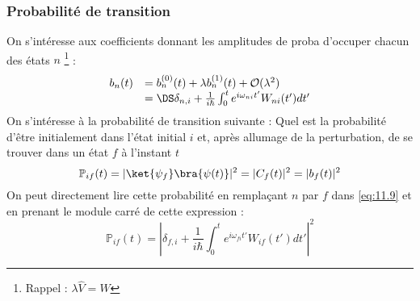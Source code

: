		\subsubsection{Probabilité de transition}
		On s'intéresse aux coefficients donnant les amplitudes de proba d'occuper chacun des états $n$
		\footnote{Rappel : $\lambda \hat{V} =\hat{W}$} :
		\begin{equation}
		\begin{array}{ll}
		b_n(t) &= b_n^{(0)}(t) + \lambda b_n^{(1)}(t) + \mathcal{O}(\lambda^2)		\\
		&=\DS \delta_{n,i} + \frac{1}{i\hbar}\int_0^t e^{i\omega_{ni}t'}W_{ni}(t')dt'
		\end{array}
		\label{eq:11.9}
		\end{equation}
		On s'intéresse à la probabilité de transition suivante : Quel est la probabilité d'être 
		initialement dans l'état initial $i$ et, après allumage de la perturbation, de se 
		trouver dans un état $f$ à l'instant $t$ 
		\begin{equation}
		\mathbb{P}_{if}(t) = |\ket{\psi_f}\bra{\psi(t)}|^2 = |C_f(t)|^2 = |b_f(t)|^2
		\end{equation}
		On peut directement lire cette probabilité en remplaçant $n$ par $f$ dans \eqref{eq:11.9} 
		et en prenant le module carré de cette expression : 
		\begin{equation}
		\mathbb{P}_{if}(t) = \left| \delta_{f,i} + \frac{1}{i\hbar}\int_0^t e^{i\omega_{fi}t'}
		W_{if}(t')dt' \right|^2
		\end{equation}
		

